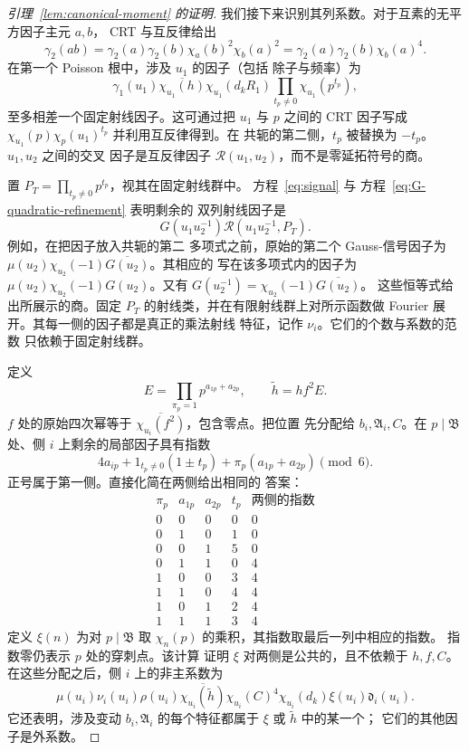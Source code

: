\documentclass[11pt,a4paper]{article}
\numberwithin{equation}{section}
\numberwithin{figure}{section}
\theoremstyle{definition}
\theoremstyle{remark}
\begin{document}
\begin{proof}[引理~\ref{lem:canonical-moment} 的证明]
我们接下来识别其列系数。对于互素的无平方因子主元 \(a,b\)，
CRT 与互反律给出
\[
 \gamma_2(ab)=\gamma_2(a)\gamma_2(b)
       \chi_a(b)^2\chi_b(a)^2
 =\gamma_2(a)\gamma_2(b)\chi_b(a)^4.
\]
在第一个 Poisson 根中，涉及 \(u_1\) 的因子（包括
除子与频率）为
\[
 \gamma_1(u_1)\overline{\chi_{u_1}(h)}
 \chi_{u_1}(d_kR_1)\prod_{t_p\ne0}\chi_{u_1}(p^{t_p}),
\]
至多相差一个固定射线因子。这可通过把
\(u_1\) 与 \(p\) 之间的 CRT 因子写成
\(\chi_{u_1}(p)\chi_p(u_1)^{t_p}\) 并利用互反律得到。在
共轭的第二侧，\(t_p\) 被替换为 \(-t_p\)。\(u_1,u_2\) 之间的交叉
因子是互反律因子
\(\mathcal R(u_1,u_2)\)，而不是零延拓符号的商。

置 \(P_T=\prod_{t_p\ne0}p^{t_p}\)，视其在固定射线群中。
方程~\eqref{eq:signal} 与
方程~\eqref{eq:G-quadratic-refinement} 表明剩余的
双列射线因子是
\[
 G(u_1u_2^{-1})\mathcal R(u_1u_2^{-1},P_T).
\]
例如，在把因子放入共轭的第二
多项式之前，原始的第二个 Gauss-信号因子为
\(\mu(u_2)\chi_{u_2}(-1)\overline{G(u_2)}\)。其相应的
写在该多项式内的因子为
\(\mu(u_2)\chi_{u_2}(-1)G(u_2)\)。又有
\(G(u_2^{-1})=\chi_{u_2}(-1)\overline{G(u_2)}\)。
这些恒等式给出所展示的商。固定
\(P_T\) 的射线类，并在有限射线群上对所示函数做 Fourier 展开。其每一侧的因子都是真正的乘法射线
特征，记作 \(\nu_i\)。它们的个数与系数的范数
只依赖于固定射线群。

定义
\[
 E=\prod_{\pi_p=1}p^{a_{1p}+a_{2p}},\qquad
 \widetilde h=hf^2E.
\]
\(f\) 处的原始四次幂等于
\(\overline{\chi_{u_i}(f^2)}\)，包含零点。把位置
先分配给 \(b_i,\mathfrak A_i,C\)。在 \(p\mid\mathfrak B\) 处、侧 \(i\) 上剩余的局部因子具有指数
\[
 4a_{ip}+1_{t_p\ne0}(1\mathbin{\pm}t_p)
          +\pi_p(a_{1p}+a_{2p})\pmod6.
\]
正号属于第一侧。直接化简在两侧给出相同的
答案：
\[
 \begin{array}{c|cc|c|c}
 \pi_p&a_{1p}&a_{2p}&t_p&\text{两侧的指数}\\ \hline
 0&0&0&0&0\\
 0&1&0&1&0\\
 0&0&1&5&0\\
 0&1&1&0&4\\
 1&0&0&3&4\\
 1&1&0&4&4\\
 1&0&1&2&4\\
 1&1&1&3&4
 \end{array}
\]
定义 \(\xi(n)\) 为对 \(p\mid\mathfrak B\) 取
\(\chi_n(p)\) 的乘积，其指数取最后一列中相应的指数。
指数零仍表示 \(p\) 处的穿刺点。该计算
证明 \(\xi\) 对两侧是公共的，且不依赖于 \(h,f,C\)。
在这些分配之后，侧 \(i\) 上的非主系数为
\begin{equation}\tag{C}\label{eq:first-poisson-column}
 \mu(u_i)\nu_i(u_i)\rho(u_i)
 \overline{\chi_{u_i}(\widetilde h)}
 \chi_{u_i}(C)^4\chi_{u_i}(d_k)\xi(u_i)\mathfrak d_i(u_i).
\end{equation}
它还表明，涉及变动
\(b_i,\mathfrak A_i\) 的每个特征都属于 \(\xi\) 或 \(\widetilde h\) 中的某一个；
它们的其他因子是外系数。


\end{proof}
\end{document}
